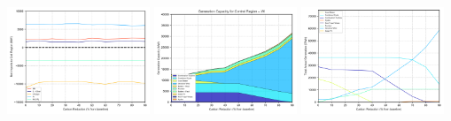 \documentclass[xcolor=dvipsnames]{beamer}
\begin{document}
\begin{frame}
    \includegraphics[width=0.32\textwidth]{includes/no_leakage_shutdowns_agg_exim.png}
  \includegraphics[width=0.32\textwidth]{includes/no_leakage_shutdowns_agg_capacity_cntlreg.png}
  \includegraphics[width=0.32\textwidth]{includes/no_leakage_shutdowns_agg_generation_cntlreg.png}

\end{frame}
\end{document}
